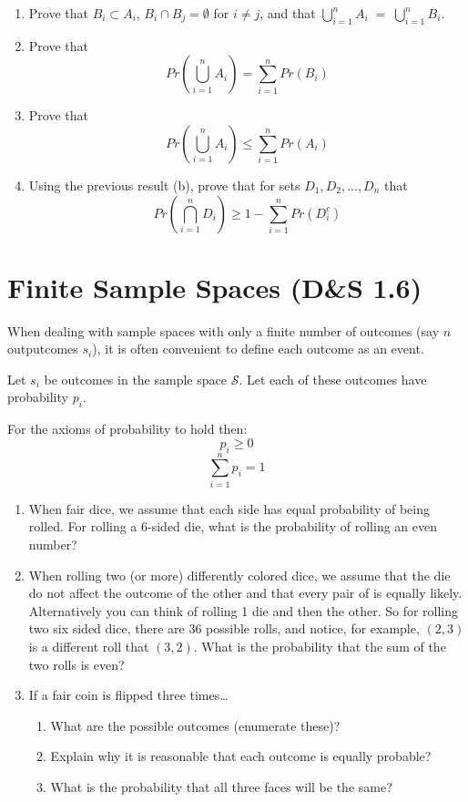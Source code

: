 \documentclass[]{book}
\providecommand{\tightlist}{%
  \setlength{\itemsep}{0pt}\setlength{\parskip}{0pt}}
\begin{document}
\begin{enumerate}
  \begin{enumerate}
  \def\labelenumii{\alph{enumii})}
  \tightlist
  \item
    Prove that \(B_i \subset A_i\), \(B_i \cap B_j = \emptyset\) for
    \(i\ne j\), and that
    \(\bigcup_{i=1}^n A_i \;=\; \bigcup_{i=1}^n B_i\).
  \item
    Prove that
    \[Pr\left( \bigcup_{i=1}^n A_i \right) = \sum_{i=1}^n Pr(B_i)\]
  \item
    Prove that
    \[Pr\left( \bigcup_{i=1}^n A_i \right) \le \sum_{i=1}^n Pr(A_i)\]
  \item
    Using the previous result (b), prove that for sets
    \(D_1,D_2,\dots,D_n\) that
    \[Pr\left( \bigcap_{i=1}^n D_i \right) \ge 1 - \sum_{i=1}^n Pr(D_i^c)\]
  \end{enumerate}
\end{enumerate}

\section{Finite Sample Spaces (D\&S
1.6)}\label{finite-sample-spaces-ds-1.6}

When dealing with sample spaces with only a finite number of outcomes
(say \(n\) outputcomes \(s_i\)), it is often convenient to define each
outcome as an event.

Let \(s_i\) be outcomes in the sample space \(\mathcal{S}\). Let each of
these outcomes have probability \(p_i\).

For the axioms of probability to hold then: \[p_i \ge 0\]
\[\sum_{i=1}^n p_i = 1\]

\begin{enumerate}
\def\labelenumi{\arabic{enumi}.}
\item
  When fair dice, we assume that each side has equal probability of
  being rolled. For rolling a 6-sided die, what is the probability of
  rolling an even number?
\item
  When rolling two (or more) differently colored dice, we assume that
  the die do not affect the outcome of the other and that every pair of
  is equally likely. Alternatively you can think of rolling 1 die and
  then the other. So for rolling two six sided dice, there are 36
  possible rolls, and notice, for example, \((2,3)\) is a different roll
  that \((3,2)\). What is the probability that the sum of the two rolls
  is even?
\item
  If a fair coin is flipped three times\ldots{}

  \begin{enumerate}
  \def\labelenumii{\alph{enumii})}
  \tightlist
  \item
    What are the possible outcomes (enumerate these)?
  \item
    Explain why it is reasonable that each outcome is equally probable?
  \item
    What is the probability that all three faces will be the same?
  \end{enumerate}
\end{enumerate}
\end{document}

